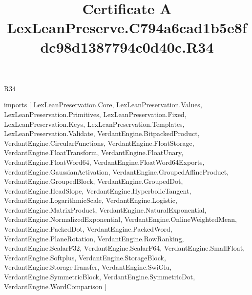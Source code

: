 \begin{lexlean}{R34}
\title{Certificate A LexLeanPreserve.C794a6cad1b5e8fdc98d1387794c0d40c.R34}
\begin{coremodule}
imports [
  LexLeanPreservation.Core,
  LexLeanPreservation.Values,
  LexLeanPreservation.Primitives,
  LexLeanPreservation.Fixed,
  LexLeanPreservation.Keys,
  LexLeanPreservation.Templates,
  LexLeanPreservation.Validate,
  VerdantEngine.BitpackedProduct,
  VerdantEngine.CircularFunctions,
  VerdantEngine.FloatStorage,
  VerdantEngine.FloatTransform,
  VerdantEngine.FloatUnary,
  VerdantEngine.FloatWord64,
  VerdantEngine.FloatWord64Exports,
  VerdantEngine.GaussianActivation,
  VerdantEngine.GroupedAffineProduct,
  VerdantEngine.GroupedBlock,
  VerdantEngine.GroupedDot,
  VerdantEngine.HeadSlope,
  VerdantEngine.HyperbolicTangent,
  VerdantEngine.LogarithmicScale,
  VerdantEngine.Logistic,
  VerdantEngine.MatrixProduct,
  VerdantEngine.NaturalExponential,
  VerdantEngine.NormalizedExponential,
  VerdantEngine.OnlineWeightedMean,
  VerdantEngine.PackedDot,
  VerdantEngine.PackedWord,
  VerdantEngine.PlaneRotation,
  VerdantEngine.RowRanking,
  VerdantEngine.ScalarF32,
  VerdantEngine.ScalarF64,
  VerdantEngine.SmallFloat,
  VerdantEngine.Softplus,
  VerdantEngine.StorageBlock,
  VerdantEngine.StorageTransfer,
  VerdantEngine.SwiGlu,
  VerdantEngine.SymmetricBlock,
  VerdantEngine.SymmetricDot,
  VerdantEngine.WordComparison
]


\end{coremodule}
\end{lexlean}
